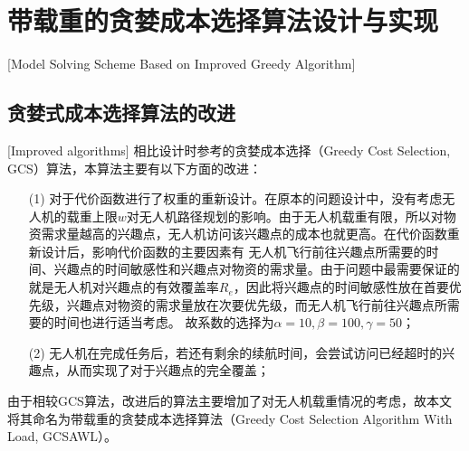 
\chapter{带载重的贪婪成本选择算法设计与实现}[Model Solving Scheme Based on Improved Greedy Algorithm]

\section{贪婪式成本选择算法的改进}[Improved algorithms]
相比设计时参考的贪婪成本选择（Greedy Cost Selection, GCS）算法，本算法主要有以下方面的改进：
\begin{itemize}
	\item [(1)] 对于代价函数进行了权重的重新设计。在原本的问题设计中，没有考虑无人机的载重上限$w$对无人机路径规划的影响。由于无人机载重有限，所以对物资需求量越高的兴趣点，无人机访问该兴趣点的成本也就更高。在代价函数重新设计后，影响代价函数的主要因素有
无人机飞行前往兴趣点所需要的时间、兴趣点的时间敏感性和兴趣点对物资的需求量。由于问题中最需要保证的就是无人机对兴趣点的有效覆盖率$R_e$，因此将兴趣点的时间敏感性放在首要优先级，兴趣点对物资的需求量放在次要优先级，而无人机飞行前往兴趣点所需要的时间也进行适当考虑。
故系数的选择为$\alpha = 10,\beta = 100,\gamma = 50$；
	\item [(2)] 无人机在完成任务后，若还有剩余的续航时间，会尝试访问已经超时的兴趣点，从而实现了对于兴趣点的完全覆盖；
\end{itemize}


由于相较GCS算法，改进后的算法主要增加了对无人机载重情况的考虑，故本文将其命名为带载重的贪婪成本选择算法（Greedy Cost Selection Algorithm With Load, GCSAWL）。

